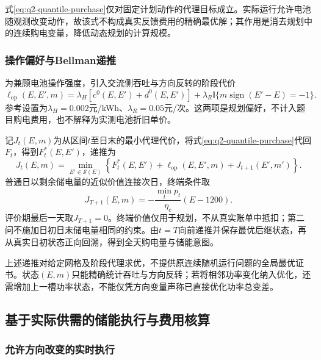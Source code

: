 式\eqref{eq:q2-quantile-purchase}仅对固定计划动作的代理目标成立。实际运行允许电池随观测改变动作，故该式不构成真实反馈费用的精确最优解；其作用是消去规划中的连续购电变量，降低动态规划的计算规模。

\subsubsection{操作偏好与Bellman递推}

为兼顾电池操作强度，引入交流侧吞吐与方向反转的阶段代价
\begin{equation}\label{eq:q2-operation-cost}
 \ell_{\mathrm{op}}(E,E',m)=\lambda_H[c^0(E,E')+d^0(E,E')]
 +\lambda_R\mathbb I\{m\operatorname{sign}(E'-E)=-1\}.
\end{equation}
参考设置为$\lambda_H=0.002$元/kWh、$\lambda_R=0.05$元/次。这两项是规划偏好，不计入题目购电费用，也不解释为实测电池折旧单价。

记$J_t(E,m)$为从区间$t$至日末的最小代理代价，将式\eqref{eq:q2-quantile-purchase}代回$F_t$，得到$F_t^*(E,E')$，递推为
\begin{equation}\label{eq:q2-bellman}
 J_t(E,m)=\min_{E'\in\mathcal S(E)}
 \left\{F_t^*(E,E')+\ell_{\mathrm{op}}(E,E',m)+J_{t+1}(E',m')\right\}.
\end{equation}
普通日以剩余储电量的近似价值连接次日，终端条件取
\begin{equation}\label{eq:q2-terminal}
 J_{T+1}(E,m)=-\frac{\min_t p_t}{\eta_c}(E-1200).
\end{equation}
评价期最后一天取$J_{T+1}=0$。终端价值仅用于规划，不从真实账单中抵扣；第二问不施加日初日末储电量相同的约束。由$t=T$向前递推并保存最优后继状态，再从真实日初状态正向回溯，得到全天购电量与储能意图。

上述递推对给定网格及阶段代理求优，不提供原连续随机运行问题的全局最优证书。状态$(E,m)$只能精确统计吞吐与方向反转；若将相邻功率变化纳入优化，还需增加上一槽功率状态，不能仅凭方向变量声称已直接优化功率总变差。

\subsection{基于实际供需的储能执行与费用核算}
\subsubsection{允许方向改变的实时执行}

